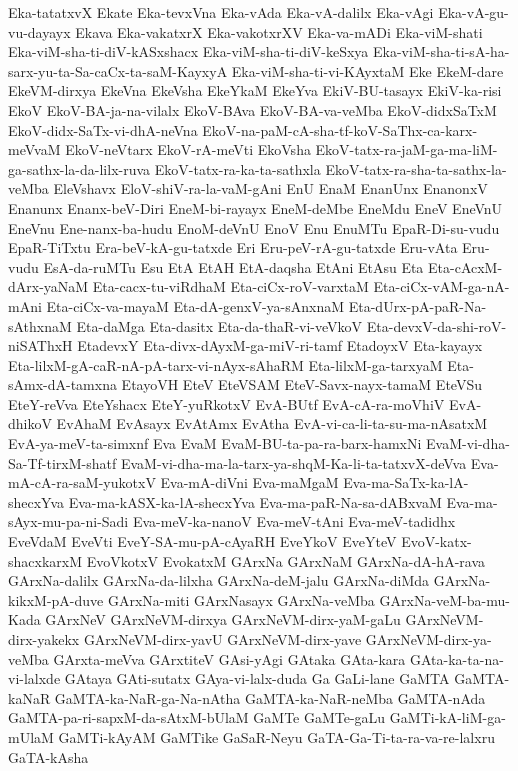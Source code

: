 {Eka-tatatxvX
Ekate
Eka-tevxVna
Eka-vAda
Eka-vA-dalilx
Eka-vAgi
Eka-vA-gu-vu-dayayx
Ekava
Eka-vakatxrX
Eka-vakotxrXV
Eka-va-mADi
Eka-viM-shati
Eka-viM-sha-ti-diV-kASxshacx
Eka-viM-sha-ti-diV-keSxya
Eka-viM-sha-ti-sA-ha-sarx-yu-ta-Sa-caCx-ta-saM-KayxyA
Eka-viM-sha-ti-vi-KAyxtaM
Eke
EkeM-dare
EkeVM-dirxya
EkeVna
EkeVsha
EkeYkaM
EkeYva
EkiV-BU-tasayx
EkiV-ka-risi
EkoV
EkoV-BA-ja-na-vilalx
EkoV-BAva
EkoV-BA-va-veMba
EkoV-didxSaTxM
EkoV-didx-SaTx-vi-dhA-neVna
EkoV-na-paM-cA-sha-tf-koV-SaThx-ca-karx-meVvaM
EkoV-neVtarx
EkoV-rA-meVti
EkoVsha
EkoV-tatx-ra-jaM-ga-ma-liM-ga-sathx-la-da-lilx-ruva
EkoV-tatx-ra-ka-ta-sathxla
EkoV-tatx-ra-sha-ta-sathx-la-veMba
EleVshavx
EloV-shiV-ra-la-vaM-gAni
EnU
EnaM
EnanUnx
EnanonxV
Enanunx
Enanx-beV-Diri
EneM-bi-rayayx
EneM-deMbe
EneMdu
EneV
EneVnU
EneVnu
Ene-nanx-ba-hudu
EnoM-deVnU
EnoV
Enu
EnuMTu
EpaR-Di-su-vudu
EpaR-TiTxtu
Era-beV-kA-gu-tatxde
Eri
Eru-peV-rA-gu-tatxde
Eru-vAta
Eru-vudu
EsA-da-ruMTu
Esu
EtA
EtAH
EtA-daqsha
EtAni
EtAsu
Eta
Eta-cAcxM-dArx-yaNaM
Eta-cacx-tu-viRdhaM
Eta-ciCx-roV-varxtaM
Eta-ciCx-vAM-ga-nA-mAni
Eta-ciCx-va-mayaM
Eta-dA-genxV-ya-sAnxnaM
Eta-dUrx-pA-paR-Na-sAthxnaM
Eta-daMga
Eta-dasitx
Eta-da-thaR-vi-veVkoV
Eta-devxV-da-shi-roV-niSAThxH
EtadevxY
Eta-divx-dAyxM-ga-miV-ri-tamf
EtadoyxV
Eta-kayayx
Eta-lilxM-gA-caR-nA-pA-tarx-vi-nAyx-sAhaRM
Eta-lilxM-ga-tarxyaM
Eta-sAmx-dA-tamxna
EtayoVH
EteV
EteVSAM
EteV-Savx-nayx-tamaM
EteVSu
EteY-reVva
EteYshacx
EteY-yuRkotxV
EvA-BUtf
EvA-cA-ra-moVhiV
EvA-dhikoV
EvAhaM
EvAsayx
EvAtAmx
EvAtha
EvA-vi-ca-li-ta-su-ma-nAsatxM
EvA-ya-meV-ta-simxnf
Eva
EvaM
EvaM-BU-ta-pa-ra-barx-hamxNi
EvaM-vi-dha-Sa-Tf-tirxM-shatf
EvaM-vi-dha-ma-la-tarx-ya-shqM-Ka-li-ta-tatxvX-deVva
Eva-mA-cA-ra-saM-yukotxV
Eva-mA-diVni
Eva-maMgaM
Eva-ma-SaTx-ka-lA-shecxYva
Eva-ma-kASX-ka-lA-shecxYva
Eva-ma-paR-Na-sa-dABxvaM
Eva-ma-sAyx-mu-pa-ni-Sadi
Eva-meV-ka-nanoV
Eva-meV-tAni
Eva-meV-tadidhx
EveVdaM
EveVti
EveY-SA-mu-pA-cAyaRH
EveYkoV
EveYteV
EvoV-katx-shacxkarxM
EvoVkotxV
EvokatxM
GArxNa
GArxNaM
GArxNa-dA-hA-rava
GArxNa-dalilx
GArxNa-da-lilxha
GArxNa-deM-jalu
GArxNa-diMda
GArxNa-kikxM-pA-duve
GArxNa-miti
GArxNasayx
GArxNa-veMba
GArxNa-veM-ba-mu-Kada
GArxNeV
GArxNeVM-dirxya
GArxNeVM-dirx-yaM-gaLu
GArxNeVM-dirx-yakekx
GArxNeVM-dirx-yavU
GArxNeVM-dirx-yave
GArxNeVM-dirx-ya-veMba
GArxta-meVva
GArxtiteV
GAsi-yAgi
GAtaka
GAta-kara
GAta-ka-ta-na-vi-lalxde
GAtaya
GAti-sutatx
GAya-vi-lalx-duda
Ga
GaLi-lane
GaMTA
GaMTA-kaNaR
GaMTA-ka-NaR-ga-Na-nAtha
GaMTA-ka-NaR-neMba
GaMTA-nAda
GaMTA-pa-ri-sapxM-da-sAtxM-bUlaM
GaMTe
GaMTe-gaLu
GaMTi-kA-liM-ga-mUlaM
GaMTi-kAyAM
GaMTike
GaSaR-Neyu
GaTA-Ga-Ti-ta-ra-va-re-lalxru
GaTA-kAsha
}
